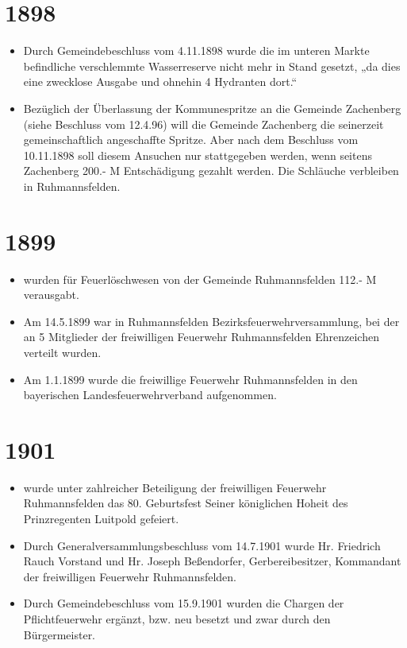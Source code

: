 \documentclass[12pt,a4paper]{book}
\begin{document}
\section*{1898}

\begin{itemize}
\item Durch Gemeindebeschluss vom 4.11.1898 wurde die im unteren Markte
befindliche verschlemmte Wasserreserve nicht mehr in Stand gesetzt, „da dies
eine zwecklose Ausgabe und ohnehin 4 Hydranten dort.“

\item Bezüglich der Überlassung der Kommunespritze an die Gemeinde Zachenberg
(siehe Beschluss vom 12.4.96) will die Gemeinde Zachenberg die seinerzeit
gemeinschaftlich angeschaffte Spritze. Aber nach dem Beschluss vom 10.11.1898
soll diesem Ansuchen nur stattgegeben werden, wenn seitens Zachenberg 200.- M
Entschädigung gezahlt werden. Die Schläuche verbleiben in Ruhmannsfelden.
\end{itemize}

\section*{1899}

\begin{itemize}
\item wurden für Feuerlöschwesen von der Gemeinde Ruhmannsfelden 112.- M
verausgabt.

\item Am 14.5.1899 war in Ruhmannsfelden Bezirksfeuerwehrversammlung, bei der an
5 Mitglieder der freiwilligen Feuerwehr Ruhmannsfelden Ehrenzeichen verteilt
wurden.

\item Am 1.1.1899 wurde die freiwillige Feuerwehr Ruhmannsfelden in den
bayerischen Landesfeuerwehrverband aufgenommen.
\end{itemize}

\section*{1901}

\begin{itemize}
\item wurde unter zahlreicher Beteiligung der freiwilligen Feuerwehr
Ruhmannsfelden das 80. Geburtsfest Seiner königlichen Hoheit des Prinzregenten
Luitpold gefeiert.

\item Durch Generalversammlungsbeschluss vom 14.7.1901 wurde Hr. Friedrich Rauch
Vorstand und Hr. Joseph Beßendorfer, Gerbereibesitzer, Kommandant der
freiwilligen Feuerwehr Ruhmannsfelden.

\item Durch Gemeindebeschluss vom 15.9.1901 wurden die Chargen der
Pflichtfeuerwehr ergänzt, bzw. neu besetzt und zwar durch den Bürgermeister.
\end{itemize}
\end{document}
